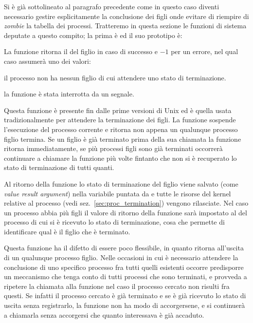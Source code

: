 Si è già sottolineato al paragrafo precedente come in questo caso diventi
necessario gestire esplicitamente la conclusione dei figli onde evitare di
riempire di \textit{zombie} la tabella dei processi. Tratteremo in questa
sezione le funzioni di sistema deputate a questo compito; la prima è
 ed il suo prototipo è:

\begin{funcproto}{ 
}
{La funzione ritorna il  del figlio in caso di successo e $-1$ per un
  errore, nel qual caso  assumerà uno dei valori:
  \begin{errlist}
  \item[\errcode{ECHILD}] il processo non ha nessun figlio di cui attendere
    uno stato di terminazione.
  \item[\errcode{EINTR}] la funzione è stata interrotta da un segnale.
  \end{errlist}}
\end{funcproto}

Questa funzione è presente fin dalle prime versioni di Unix ed è quella usata
tradizionalmente per attendere la terminazione dei figli. La funzione sospende
l'esecuzione del processo corrente e ritorna non appena un qualunque processo
figlio termina. Se un figlio è già terminato prima della sua chiamata la
funzione ritorna immediatamente, se più processi figli sono già terminati
occorrerà continuare a chiamare la funzione più volte fintanto che non si è
recuperato lo stato di terminazione di tutti quanti.

Al ritorno della funzione lo stato di terminazione del figlio viene salvato
(come \textit{value result argument}) nella variabile puntata
da  e tutte le risorse del kernel relative al processo (vedi
sez.~\ref{sec:proc_termination}) vengono rilasciate.  Nel caso un processo
abbia più figli il valore di ritorno della funzione sarà impostato al
 del processo di cui si è ricevuto lo stato di terminazione, cosa che
permette di identificare qual è il figlio che è terminato.


Questa funzione ha il difetto di essere poco flessibile, in quanto ritorna
all'uscita di un qualunque processo figlio. Nelle occasioni in cui è
necessario attendere la conclusione di uno specifico processo fra tutti quelli
esistenti occorre predisporre un meccanismo che tenga conto di tutti processi
che sono terminati, e provveda a ripetere la chiamata alla funzione nel caso
il processo cercato non risulti fra questi. Se infatti il processo cercato è
già terminato e se è già ricevuto lo stato di uscita senza registrarlo, la
funzione non ha modo di accorgersene, e si continuerà a chiamarla senza
accorgersi che quanto interessava è già accaduto.

